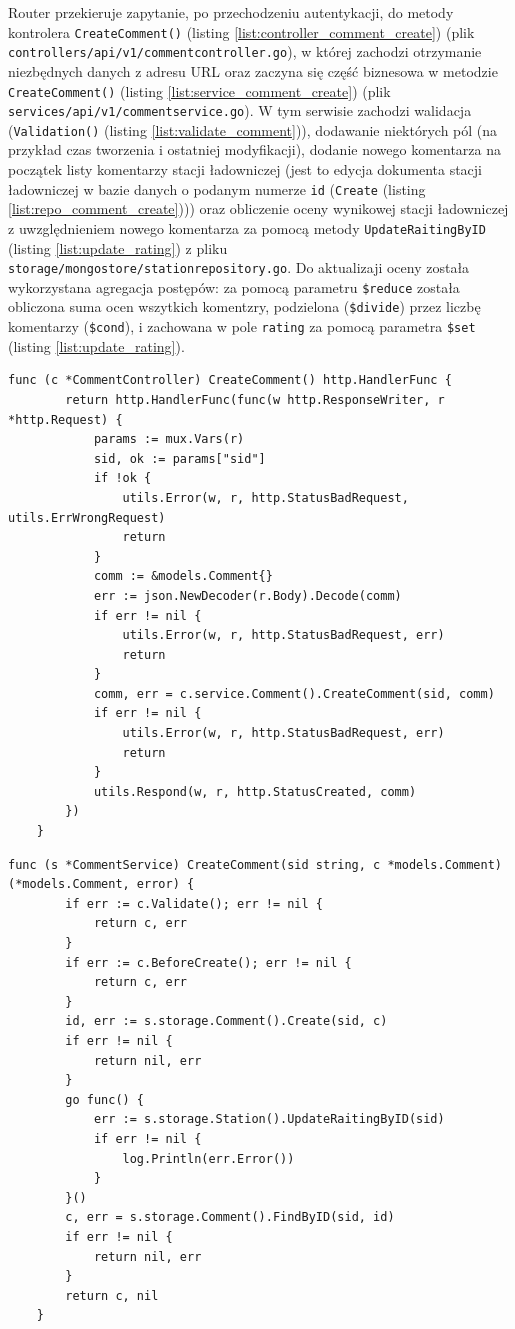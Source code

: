 Router przekieruje zapytanie, po przechodzeniu autentykacji, do metody kontrolera \texttt{CreateComment()} (listing \ref{list:controller_comment_create}) (plik \texttt{controllers/api/v1/commentcontroller.go}), w której zachodzi otrzymanie niezbędnych danych z adresu URL oraz zaczyna się część biznesowa w metodzie \texttt{CreateComment()} (listing \ref{list:service_comment_create}) (plik \texttt{services/api/v1/commentservice.go}).
W tym serwisie zachodzi walidacja (\texttt{Validation()} (listing \ref{list:validate_comment})), dodawanie niektórych pól (na przykład czas tworzenia i ostatniej modyfikacji), dodanie nowego komentarza na początek listy komentarzy stacji ładowniczej (jest to edycja dokumenta stacji ładowniczej w bazie danych o podanym numerze \texttt{id} (\texttt{Create} (listing \ref{list:repo_comment_create}))) oraz obliczenie oceny wynikowej stacji ładowniczej z uwzględnieniem nowego komentarza za pomocą metody \texttt{UpdateRaitingByID} (listing \ref{list:update_rating}) z pliku \texttt{storage/mongostore/stationrepository.go}.
Do aktualizaji oceny została wykorzystana agregacja postępów: za pomocą parametru \texttt{\$reduce} została obliczona suma ocen wszytkich komentzry, podzielona (\texttt{\$divide}) przez liczbę komentarzy (\texttt{\$cond}), i zachowana w pole \texttt{rating} za pomocą parametra \texttt{\$set} (listing \ref{list:update_rating}).
\begin{lstlisting}[label=list:controller_comment_create,caption=Kontroler tworzenia komentarza,basicstyle=\tiny\ttfamily]
    func (c *CommentController) CreateComment() http.HandlerFunc {
        return http.HandlerFunc(func(w http.ResponseWriter, r *http.Request) {
            params := mux.Vars(r)
            sid, ok := params["sid"]
            if !ok {
                utils.Error(w, r, http.StatusBadRequest, utils.ErrWrongRequest)
                return
            }
            comm := &models.Comment{}
            err := json.NewDecoder(r.Body).Decode(comm)
            if err != nil {
                utils.Error(w, r, http.StatusBadRequest, err)
                return
            }
            comm, err = c.service.Comment().CreateComment(sid, comm)
            if err != nil {
                utils.Error(w, r, http.StatusBadRequest, err)
                return
            }
            utils.Respond(w, r, http.StatusCreated, comm)
        })
    }
\end{lstlisting}
\begin{lstlisting}[label=list:service_comment_create,caption=Serwis tworzenia komentarza,basicstyle=\tiny\ttfamily]
    func (s *CommentService) CreateComment(sid string, c *models.Comment) (*models.Comment, error) {
        if err := c.Validate(); err != nil {
            return c, err
        }
        if err := c.BeforeCreate(); err != nil {
            return c, err
        }
        id, err := s.storage.Comment().Create(sid, c)
        if err != nil {
            return nil, err
        }
        go func() {
            err := s.storage.Station().UpdateRaitingByID(sid)
            if err != nil {
                log.Println(err.Error())
            }
        }()
        c, err = s.storage.Comment().FindByID(sid, id)
        if err != nil {
            return nil, err
        }
        return c, nil
    }
\end{lstlisting}
